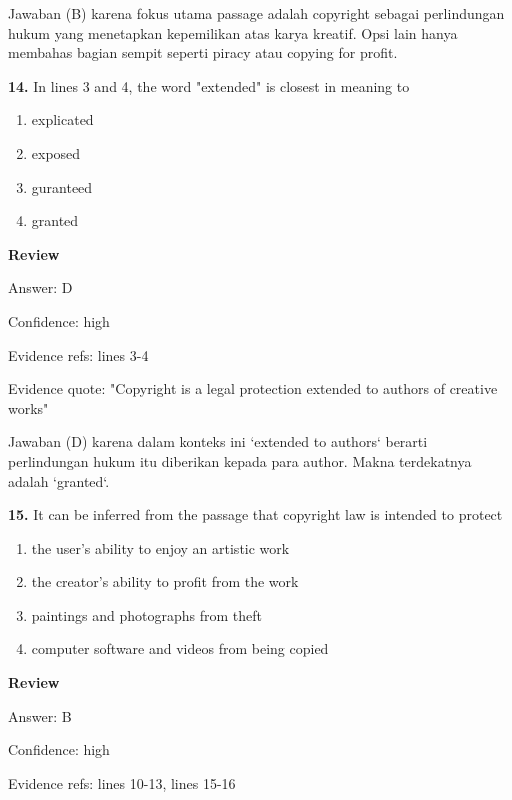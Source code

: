 \documentclass[12pt]{article}
\begin{document}
Jawaban (B) karena fokus utama passage adalah copyright sebagai perlindungan hukum yang menetapkan kepemilikan atas karya kreatif. Opsi lain hanya membahas bagian sempit seperti piracy atau copying for profit.\par
\endgroup
\par
\vspace{0.25\baselineskip}
\noindent\textbf{14.} In lines 3 and 4, the word "extended" is closest in meaning to
\begin{enumerate}[label=(\Alph*),leftmargin=*,itemsep=0.2em]
\item explicated
\item exposed
\item guranteed
\item granted
\end{enumerate}
\par
\begingroup
\setlength{\parskip}{0pt}
\setlength{\parindent}{0pt}
\textbf{Review}\par
Answer: D\par
Confidence: high\par
Evidence refs: lines 3-4\par
Evidence quote: "Copyright is a legal protection extended to authors of creative works"\par
Jawaban (D) karena dalam konteks ini `extended to authors` berarti perlindungan hukum itu diberikan kepada para author. Makna terdekatnya adalah `granted`.\par
\endgroup
\par
\vspace{0.25\baselineskip}
\noindent\textbf{15.} It can be inferred from the passage that copyright law is intended to protect
\begin{enumerate}[label=(\Alph*),leftmargin=*,itemsep=0.2em]
\item the user's ability to enjoy an artistic work
\item the creator's ability to profit from the work
\item paintings and photographs from theft
\item computer software and videos from being copied
\end{enumerate}
\par
\begingroup
\setlength{\parskip}{0pt}
\setlength{\parindent}{0pt}
\textbf{Review}\par
Answer: B\par
Confidence: high\par
Evidence refs: lines 10-13, lines 15-16\par
\end{document}
